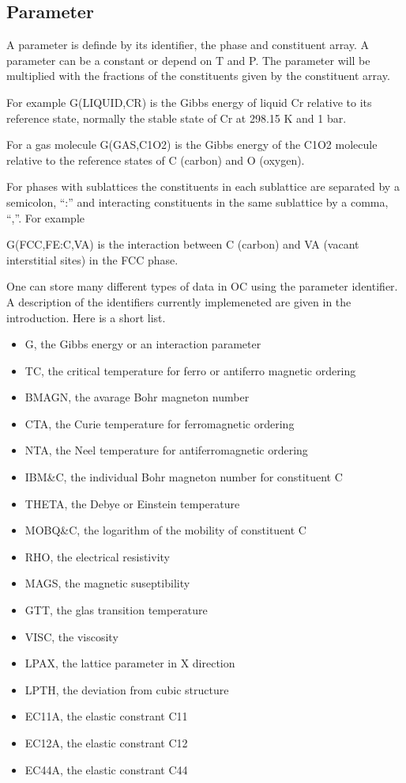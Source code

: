 \documentclass[12pt]{article}
\begin{document}
\subsection{Parameter}

A parameter is definde by its identifier, the phase and constituent
array.  A parameter can be a constant or depend on T and P.  The
parameter will be multiplied with the fractions of the constituents
given by the constituent array.

For example G(LIQUID,CR) is the Gibbs energy of liquid Cr relative to
its reference state, normally the stable state of Cr at 298.15 K and 1
bar.

For a gas molecule G(GAS,C1O2) is the Gibbs energy of the C1O2 molecule
relative to the reference states of C (carbon) and O (oxygen).

For phases with sublattices the constituents in each sublattice are
separated by a semicolon, ``:'' and interacting constituents in
the same sublattice by a comma, ``,''.  For example

G(FCC,FE:C,VA) is the interaction between C (carbon) and VA (vacant
interstitial sites) in the FCC phase.

One can store many different types of data in OC using the parameter
identifier.  A description of the identifiers currently implemeneted
are given in the introduction.  Here is a short list.

\begin{itemize}
\item G, the Gibbs energy or an interaction parameter
\item TC, the critical temperature for ferro or antiferro magnetic ordering
\item BMAGN, the avarage Bohr magneton number
\item CTA, the Curie temperature for ferromagnetic ordering
\item NTA, the Neel temperature for antiferromagnetic ordering
\item IBM\&C, the individual Bohr magneton number for constituent C
\item THETA, the Debye or Einstein temperature
\item MOBQ\&C, the logarithm of the mobility of constituent C
\item RHO, the electrical resistivity
\item MAGS, the magnetic suseptibility
\item GTT, the glas transition temperature
\item VISC, the viscosity
\item LPAX, the lattice parameter in X direction
\item LPTH, the deviation from cubic structure
\item EC11A, the elastic constrant C11
\item EC12A, the elastic constrant C12
\item EC44A, the elastic constrant C44
\end{itemize}
\end{document}
